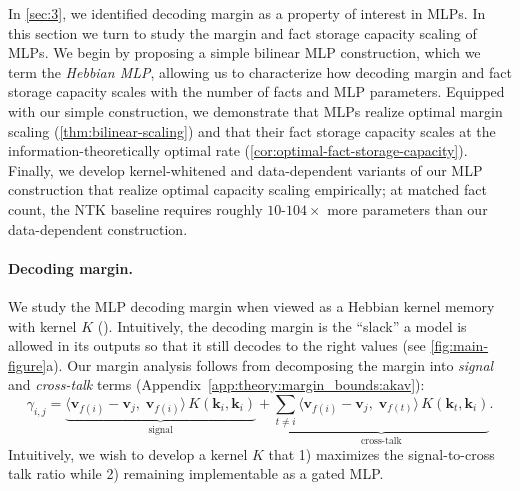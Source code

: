 In \cref{sec:3}, we identified decoding margin as a property of interest in MLPs. In this section we turn to study the margin and fact storage capacity scaling of MLPs. We begin by proposing a simple bilinear MLP construction, which we term the \emph{Hebbian MLP}, allowing us to characterize how decoding margin and fact storage capacity scales with the number of facts and MLP parameters. Equipped with our simple construction, we demonstrate that MLPs realize optimal margin scaling (\cref{thm:bilinear-scaling}) and that their fact storage capacity scales at the information-theoretically optimal rate (\cref{cor:optimal-fact-storage-capacity}). Finally, we develop kernel-whitened and data-dependent variants of our MLP construction that realize optimal capacity scaling empirically; at matched fact count, the NTK baseline requires roughly $10$-$104\times$ more parameters than our data-dependent construction.

\paragraph{Decoding margin.} We study the MLP decoding margin when viewed as a Hebbian kernel memory with kernel $K$ (). Intuitively, the decoding margin is the ``slack'' a model is allowed in its outputs so that it still decodes to the right values (see \cref{fig:main-figure}a). Our margin analysis follows from decomposing the margin into \emph{signal} and \emph{cross-talk} terms (Appendix~\ref{app:theory:margin_bounds:akav}):
\begin{equation}
\gamma_{i,j}
=
\underbrace{
\langle \mathbf{v}_{f(i)} - \mathbf{v}_{j},\; \mathbf{v}_{f(i)} \rangle \,K(\mathbf{k}_{i}, \mathbf{k}_{i})
}_{\text{signal}}
+
\underbrace{
\sum_{t \neq i}
\langle \mathbf{v}_{f(i)} - \mathbf{v}_{j},\; \mathbf{v}_{f(t)} \rangle \,K(\mathbf{k}_{t}, \mathbf{k}_{i})
}_{\text{cross-talk}}.
\label{eqn:margin-decomposition}
\end{equation}
Intuitively, we wish to develop a kernel $K$ that 1) maximizes the signal-to-cross talk ratio while 2) remaining implementable as a gated MLP.

